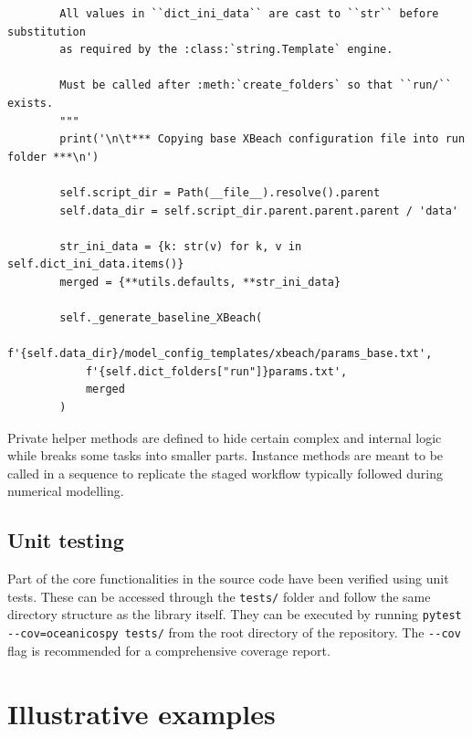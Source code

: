 \documentclass[preprint,12pt, a4paper]{elsarticle}
\begin{document}
\begin{lstlisting}
        All values in ``dict_ini_data`` are cast to ``str`` before substitution
        as required by the :class:`string.Template` engine.

        Must be called after :meth:`create_folders` so that ``run/`` exists.
        """
        print('\n\t*** Copying base XBeach configuration file into run folder ***\n')

        self.script_dir = Path(__file__).resolve().parent
        self.data_dir = self.script_dir.parent.parent.parent / 'data'

        str_ini_data = {k: str(v) for k, v in self.dict_ini_data.items()}
        merged = {**utils.defaults, **str_ini_data}

        self._generate_baseline_XBeach(
            f'{self.data_dir}/model_config_templates/xbeach/params_base.txt',
            f'{self.dict_folders["run"]}params.txt',
            merged
        )
\end{lstlisting}

Private helper methods are defined to hide certain complex and internal logic while breaks some tasks into smaller parts. Instance methods are meant to be called in a sequence to replicate the staged workflow typically followed during numerical modelling. 

\subsection{Unit testing}

Part of the core functionalities in the source code have been verified using unit tests. These can be accessed through the \texttt{tests/} folder and follow the same directory structure as the library itself. They can be executed by running \verb|pytest --cov=oceanicospy tests/| from the root directory of the repository. The \texttt{-{-}cov} flag is recommended for a comprehensive coverage report.

\section{Illustrative examples}

\end{document}
